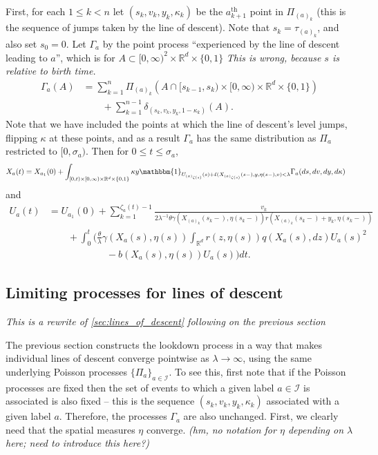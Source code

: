 \documentclass[12pt]{article}
\newcommand{\IR}{\mathbb R}
\newcommand{\labelspace}{\mathcal{I}} %
\newcommand{\comment}[1]{{\color{blue} \it #1}}
\begin{document}
First, for each $1 \le k < n$
let $(s_k, v_k, y_k, \kappa_k)$ be the $a_{k+1}^\text{th}$ point in $\Pi_{(a)_k}$
(this is the sequence of jumps taken by the line of descent).
Note that $s_k = \tau_{(a)_k}$, and also set $s_0 = 0$.
Let $\Gamma_a$ by the point process ``experienced by the line of descent leading to $a$'',
which is for $A \subset [0,\infty)^2 \times \IR^d \times \{0,1\}$
\comment{This is wrong, because $s$ is relative to birth time.}
\begin{align*}
\Gamma_a(A)
    &=
    \sum_{k=1}^n
    \Pi_{(a)_k}\left(A \cap [s_{k-1}, s_k) \times [0, \infty) \times \IR^d \times \{0,1\}\right) 
    \\ &\qquad {}
    + \sum_{k=1}^{n-1}
      \delta_{(s_k, v_k, y_k, 1 - \kappa_k)}(A) .
\end{align*}
Note that we have included the points at which the line of descent's level jumps,
flipping $\kappa$ at these points,
and as a result $\Gamma_a$ has the same distribution as $\Pi_a$
restricted to $[0, \sigma_a)$.
Then for $0 \le t \le \sigma_a$,
\begin{align*}
    X_a(t)
    &=
    X_{a_1}(0)
    +
    \int_{
        [0, t) \times [0, \infty) \times \IR^d \times \{0, 1\}
    }
    \kappa y
    \mathbbm{1}_{
        U_{(a)_{\zeta(s)}}(s) + \ell( X_{(a)_{\zeta(s)}}(s-), y, \eta(s-), v) < \lambda
    }
    \Gamma_{a}(ds, dv, dy, d\kappa) 
\end{align*}
and
\begin{align*}
    U_a(t)
    &=
    U_{a_1}(0)
    +
    \sum_{k=1}^{\zeta_a(t) - 1}
    \frac{
        v_k
    }{
        2 \lambda^{-1} \theta \gamma(X_{(a)_k}(s_k-), \eta(s_k-))
        r(X_{(a)_k}(s_k-) + y_k, \eta(s_k-))
    }
    \\ & \qquad {}
    +
    \int_0^t
    \bigg(
        \frac{\theta}{\lambda} \gamma(X_a(s),\eta(s))
        \int_{\IR^d} r(z,\eta(s)) q(X_a(s),dz) U_a(s)^2
    \\ & \qquad\qquad  \qquad {}
        -
        b(X_a(s),\eta(s)) U_a(s)
    \bigg)
    dt .
\end{align*}


\subsection{Limiting processes for lines of descent}

\comment{This is a rewrite of \ref{sec:lines_of_descent} following on the previous section}

The previous section constructs the lookdown process
in a way that makes individual lines of descent converge pointwise as $\lambda \to \infty$,
using the same underlying Poisson processes $\{\Pi_a\}_{a \in \labelspace}$.
To see this, first note that if the Poisson processes are fixed
then the set of events to which a given label $a \in \labelspace$ is associated
is also fixed -- this is the sequence $(s_k, v_k, y_k, \kappa_k)$ associated with a given label $a$.
Therefore, the processes $\Gamma_a$ are also unchanged.
First, we clearly need that the spatial measures $\eta$ converge.
\comment{(hm, no notation for $\eta$ depending on $\lambda$ here; need to introduce this here?)}
\end{document}
